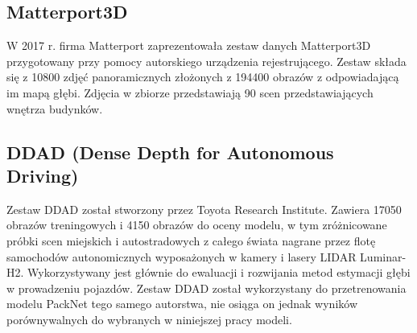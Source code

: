 \subsection{Matterport3D}
W 2017 r. firma Matterport zaprezentowała zestaw danych Matterport3D \cite{chang2017} przygotowany przy pomocy autorskiego urządzenia rejestrującego. Zestaw składa się z 10800 zdjęć panoramicznych złożonych z 194400 obrazów z odpowiadającą im mapą głębi. Zdjęcia w zbiorze przedstawiają 90 scen przedstawiających wnętrza budynków. 
\subsection{DDAD (Dense Depth for Autonomous Driving)}
Zestaw DDAD \cite{guizilini2020} został stworzony przez Toyota Research Institute. Zawiera 17050 obrazów treningowych i 4150 obrazów do oceny modelu, w tym zróżnicowane próbki scen miejskich i autostradowych z całego świata nagrane przez flotę samochodów autonomicznych wyposażonych w kamery i lasery LIDAR Luminar-H2. Wykorzystywany jest głównie do ewaluacji i rozwijania metod estymacji głębi w prowadzeniu pojazdów. Zestaw DDAD został wykorzystany do przetrenowania modelu PackNet tego samego autorstwa, nie osiąga on jednak wyników porównywalnych do wybranych w niniejszej pracy modeli.

